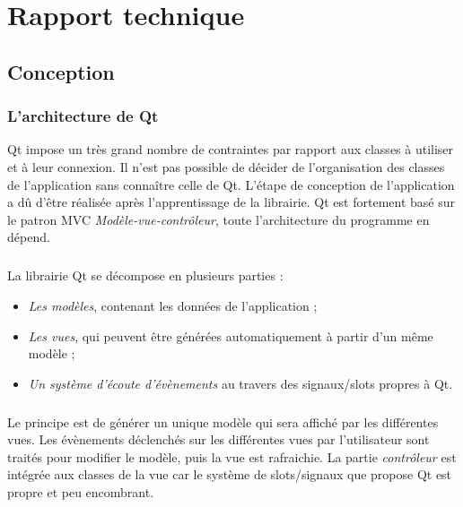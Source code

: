 \chapter{Rapport technique}

\section{Conception}

\subsection{L'architecture de Qt}

Qt impose un très grand nombre de contraintes par rapport aux classes à utiliser et à leur connexion.
Il n'est pas possible de décider de l'organisation des classes de l'application sans connaître celle de Qt.
L'étape de conception de l'application a dû d'être réalisée après l'apprentissage de la librairie.
Qt est fortement basé sur le patron MVC \emph{Modèle-vue-contrôleur}, toute l'architecture du programme en dépend.
\paragraph{}

La librairie Qt se décompose en plusieurs parties :
\begin{itemize}
\item \emph{Les modèles}, contenant les données de l'application ;
\item \emph{Les vues}, qui peuvent être générées automatiquement à partir d'un même modèle ;
\item \emph{Un système d'écoute d'évènements} au travers des signaux/slots propres à Qt.
\end{itemize}

\paragraph{}
Le principe est de générer un unique modèle qui sera affiché par les différentes vues.
Les évènements déclenchés sur les différentes vues par l'utilisateur sont traités pour modifier le modèle, puis la vue est rafraichie.
La partie \emph{contrôleur} est intégrée aux classes de la vue car le système de slots/signaux que propose Qt est propre et peu encombrant.

